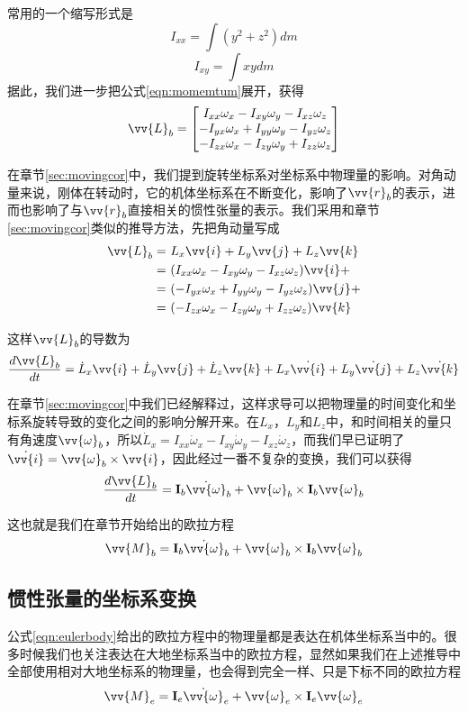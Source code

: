 \documentclass[11pt]{article}
\begin{document}
常用的一个缩写形式是
$$
I_{xx} = \int (y^2+z^2) dm
$$
$$
I_{xy} = \int xy dm
$$
据此，我们进一步把公式\ref{eqn:momemtum}展开，获得
$$
\vv{L}_b = 
\begin{bmatrix}
I_{xx}\omega_x-I_{xy}\omega_y-I_{xz}\omega_z\\
-I_{yx}\omega_x+I_{yy}\omega_y-I_{yz}\omega_z\\
-I_{zx}\omega_x-I_{zy}\omega_y+I_{zz}\omega_z
\end{bmatrix}
$$

在章节\ref{sec:movingcor}中，我们提到旋转坐标系对坐标系中物理量的影响。对角动量来说，刚体在转动时，它的机体坐标系在不断变化，影响了$\vv{r}_b$的表示，进而也影响了与$\vv{r}_b$直接相关的惯性张量的表示。我们采用和章节\ref{sec:movingcor}类似的推导方法，先把角动量写成
\begin{align*}
\vv{L}_b = & \ L_x \vv{i} + L_y \vv{j} + L_z \vv{k} \\
	   = & \ (I_{xx}\omega_x-I_{xy}\omega_y-I_{xz}\omega_z)\vv{i} + \\
	   = & \ (-I_{yx}\omega_x+I_{yy}\omega_y-I_{yz}\omega_z)\vv{j} + \\
	   = & \ (-I_{zx}\omega_x-I_{zy}\omega_y+I_{zz}\omega_z)\vv{k} 
\end{align*}

这样$\vv{L}_b$的导数为
$$
\frac{d\vv{L}_b}{dt} =  \dot{L}_x \vv{i} + \dot{L}_y \vv{j} + \dot{L}_z \vv{k} + L_x \dot{\vv{i}} + L_y \dot{\vv{j}} + L_z \dot{\vv{k}} 
$$

在章节\ref{sec:movingcor}中我们已经解释过，这样求导可以把物理量的时间变化和坐标系旋转导致的变化之间的影响分解开来。在$L_x$，$L_y$和$L_z$中，和时间相关的量只有角速度$\vv{\omega}_b$，所以$\dot{L}_x = I_{xx}\dot{\omega}_x-I_{xy}\dot{\omega}_y-I_{xz}\dot{\omega}_z$，而我们早已证明了$\dot{\vv{i}} = \vv{\omega}_b \times \vv{i}$，因此经过一番不复杂的变换，我们可以获得
$$
\frac{d\vv{L}_b}{dt} = {\bf I}_b\dot{\vv{\omega}}_b + \vv{\omega}_b\times{\bf I}_b\vv{\omega}_b
$$

这也就是我们在章节开始给出的欧拉方程
\begin{equation}\label{eqn:eulerbody}
\vv{M}_b = {\bf I}_b\dot{\vv{\omega}}_b + \vv{\omega}_b \times {\bf I}_b\vv{\omega}_b
\end{equation}
\subsection{惯性张量的坐标系变换}\label{sec:tensortrans}
公式\ref{eqn:eulerbody}给出的欧拉方程中的物理量都是表达在机体坐标系当中的。很多时候我们也关注表达在大地坐标系当中的欧拉方程，显然如果我们在上述推导中全部使用相对大地坐标系的物理量，也会得到完全一样、只是下标不同的欧拉方程
\begin{equation}\label{eqn:eulerground}
\vv{M}_e = {\bf I}_e\dot{\vv{\omega}}_e + \vv{\omega}_e \times {\bf I}_e\vv{\omega}_e
\end{equation}
\end{document}
